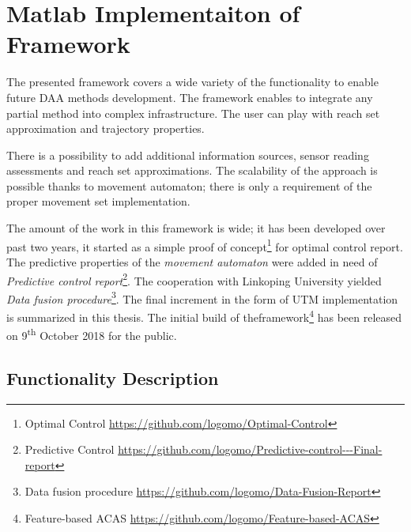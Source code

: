 \cleardoublepage

\chapter{Matlab Implementaiton of Framework}
\noindent The presented framework covers a wide variety of the functionality to enable future DAA methods development. The framework enables to integrate any partial method into complex infrastructure. The user can play with reach set approximation and trajectory properties. 

There is a possibility to add additional information sources, sensor reading assessments and reach set approximations. The scalability of the approach is possible thanks to movement automaton; there is only a requirement of the proper movement set implementation. 

The amount of the work in this framework is wide; it has been developed over past two years, it started as a simple proof of concept\footnote{Optimal Control \url{https://github.com/logomo/Optimal-Control}} for optimal control report. The predictive properties of the \emph{movement automaton} were added in need of \emph{Predictive control report}\footnote{Predictive Control \url{https://github.com/logomo/Predictive-control---Final-report}}. The cooperation with Linkoping University yielded \emph{Data fusion procedure}\footnote{Data fusion procedure \url{https://github.com/logomo/Data-Fusion-Report}}. The final increment in the form of UTM implementation is summarized in this thesis. The initial build of theframework\footnote{Feature-based ACAS \url{https://github.com/logomo/Feature-based-ACAS}} has been released on 9\textsuperscript{th} October 2018 for the public. 

\section{Functionality Description}
